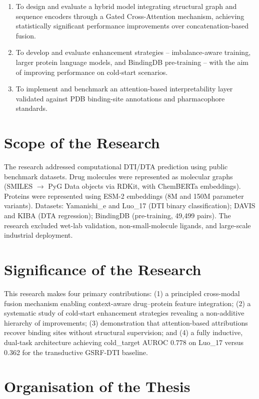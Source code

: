 \documentclass[12pt,a4paper,oneside]{report}
\begin{document}
\begin{enumerate}[leftmargin=1.5em]
  \item To design and evaluate a hybrid model integrating structural graph and sequence encoders through a Gated Cross-Attention mechanism, achieving statistically significant performance improvements over concatenation-based fusion.
  \item To develop and evaluate enhancement strategies -- imbalance-aware training, larger protein language models, and BindingDB pre-training -- with the aim of improving performance on cold-start scenarios.
  \item To implement and benchmark an attention-based interpretability layer validated against PDB binding-site annotations and pharmacophore standards.
\end{enumerate}

\section{Scope of the Research}

The research addressed computational DTI/DTA prediction using public benchmark datasets. Drug molecules were represented as molecular graphs (SMILES $\rightarrow$ PyG Data objects via RDKit, with ChemBERTa embeddings). Proteins were represented using ESM-2 embeddings (8M and 150M parameter variants). Datasets: Yamanishi\_e and Luo\_17 (DTI binary classification); DAVIS and KIBA (DTA regression); BindingDB (pre-training, 49,499 pairs). The research excluded wet-lab validation, non-small-molecule ligands, and large-scale industrial deployment.

\section{Significance of the Research}

This research makes four primary contributions: (1) a principled cross-modal fusion mechanism enabling context-aware drug--protein feature integration; (2) a systematic study of cold-start enhancement strategies revealing a non-additive hierarchy of improvements; (3) demonstration that attention-based attributions recover binding sites without structural supervision; and (4) a fully inductive, dual-task architecture achieving cold\_target AUROC 0.778 on Luo\_17 versus 0.362 for the transductive GSRF-DTI baseline.

\section{Organisation of the Thesis}
\end{document}
